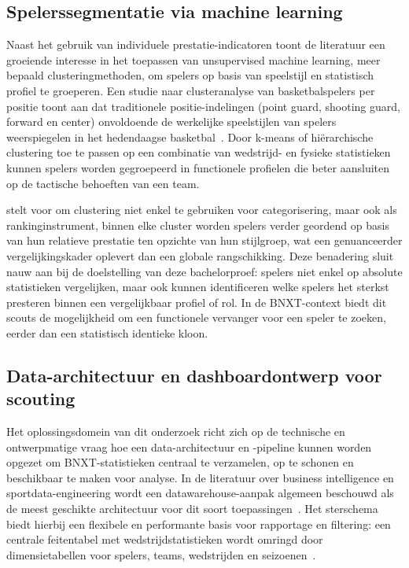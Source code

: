 \subsection{Spelerssegmentatie via machine learning}%
\label{subsec:clustering}

Naast het gebruik van individuele prestatie-indicatoren toont de literatuur een
groeiende interesse in het toepassen van unsupervised machine learning, meer
bepaald clusteringmethoden, om spelers op basis van speelstijl en statistisch
profiel te groeperen. Een studie naar clusteranalyse van basketbalspelers per
positie toont aan dat traditionele positie-indelingen (point guard, shooting
guard, forward en center) onvoldoende de werkelijke speelstijlen van spelers
weerspiegelen in het hedendaagse basketbal~\autocite{Baumann2022}. Door k-means
of hiërarchische clustering toe te passen op een combinatie van wedstrijd- en
fysieke statistieken kunnen spelers worden gegroepeerd in functionele profielen
die beter aansluiten op de tactische behoeften van een team.

\textcite{Baumann2022} stelt voor om clustering niet enkel te gebruiken voor
categorisering, maar ook als rankinginstrument, binnen elke cluster worden spelers
verder geordend op basis van hun relatieve prestatie ten opzichte van hun
stijlgroep, wat een genuanceerder vergelijkingskader oplevert dan een globale
rangschikking. Deze benadering sluit nauw aan bij de doelstelling van deze
bachelorproef: spelers niet enkel op absolute statistieken vergelijken, maar ook
kunnen identificeren welke spelers het sterkst presteren binnen een vergelijkbaar
profiel of rol. In de BNXT-context biedt dit scouts de mogelijkheid om een
functionele vervanger voor een speler te zoeken, eerder dan een statistisch
identieke kloon.

\subsection{Data-architectuur en dashboardontwerp voor scouting}%
\label{subsec:architectuur-dashboard}

Het oplossingsdomein van dit onderzoek richt zich op de technische en
ontwerpmatige vraag hoe een data-architectuur en -pipeline kunnen worden opgezet
om BNXT-statistieken centraal te verzamelen, op te schonen en beschikbaar te
maken voor analyse. In de literatuur over business intelligence en
sportdata-engineering wordt een datawarehouse-aanpak algemeen beschouwd als de
meest geschikte architectuur voor dit soort toepassingen~\autocite{iglesiasdata}.
Het sterschema biedt hierbij een flexibele en performante basis voor rapportage en
filtering: een centrale feitentabel met wedstrijdstatistieken wordt omringd door
dimensietabellen voor spelers, teams, wedstrijden en seizoenen~\autocite{Meegle2026}.

